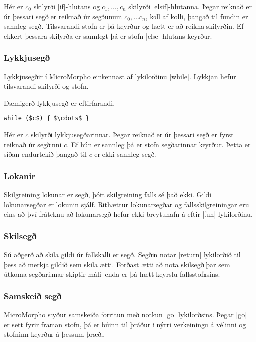 \documentclass[12pt]{article}
\begin{document}
Hér er $c_0$ skilyrði |if|-hlutans og $c_1, \ldots, c_n$ skilyrði |elsif|-hlutanna.
Þegar reiknað er úr þessari segð er reiknað úr segðunum $c_0, \ldots c_n$, koll af kolli,
þangað til fundin er sannleg segð. Tilsvarandi stofn er þá keyrður og hætt er að reikna
skilyrðin. Ef ekkert þessara skilyrða er sannlegt þá er stofn |else|-hlutans keyrður.

\subsubsection{Lykkjusegð}\label{whileexpr}
Lykkjusegðir í MicroMorpho einkennast af lykilorðinu |while|.
Lykkjan hefur tilsvarandi skilyrði og stofn.

Dæmigerð lykkjusegð er eftirfarandi.

\begin{mdframed}[style=langframe]
\begin{Verbatim}[commandchars=\\?!,codes={\catcode`$=3\catcode`^=7}]
while ($c$) { $\cdots$ }
\end{Verbatim}
\end{mdframed}

Hér er $c$ skilyrði lykkjusegðarinnar. Þegar reiknað er úr þessari segð
er fyrst reiknað úr segðinni $c$. Ef hún er sannleg þá er stofn segðarinnar keyrður.
Þetta er síðan endurtekið þangað til $c$ er ekki sannleg segð.

\subsubsection{Lokanir}
Skilgreining lokunar er segð, þótt skilgreining falls sé það ekki.
Gildi lokunarsegðar er lokunin sjálf.
Rithættur lokunarsegðar og fallsskilgreiningar eru eins að því fráteknu
að lokunarsegð hefur ekki breytunafn á eftir |fun| lykilorðinu.

\subsubsection{Skilsegð}
Sú aðgerð að skila gildi úr fallskalli er segð. Segðin notar |return| lykilorðið
til þess að merkja gildið sem skila ætti. Forðast ætti að nota
skilsegð þar sem útkoma segðarinnar skiptir máli, enda er þá hætt keyrslu
fallsstofnsins.

\subsubsection{Samskeið segð}
MicroMorpho styður samskeiða forritun með notkun |go| lykilorðsins.
Þegar |go| er sett fyrir framan stofn, þá er búinn til þráður í nýrri verkeiningu
á vélinni og stofninn keyrður á þessum þræði.
\end{document}
